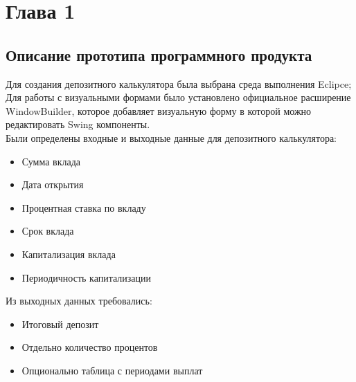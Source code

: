 \newpage
\section{Глава 1}
\subsection{Описание прототипа программного продукта}
Для создания депозитного калькулятора была выбрана среда выполнения Eclipce;
Для работы с визуальными формами было установлено официальное расширение
WindowBuilder, которое добавляет визуальную форму в которой можно редактировать
Swing компоненты.\\
Были определены входные и выходные данные для депозитного калькулятора:
\begin{itemize}
\item Сумма вклада
\item Дата открытия
\item Процентная ставка по вкладу
\item Срок вклада
\item Капитализация вклада
\item Периодичность капитализации
\end{itemize}
Из выходных данных требовались:
\begin{itemize}
	\item Итоговый депозит
	\item Отдельно количество процентов
	\item Опционально таблица с периодами выплат
\end{itemize}

